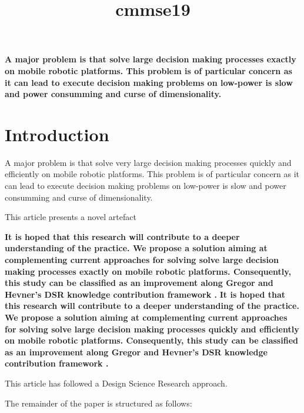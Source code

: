 \documentclass{article}
\title{cmmse19}
\author{}
\begin{document}
\maketitle
      

\textbf{
A major problem is that solve large decision making  processes exactly on mobile robotic platforms. This problem is of particular concern as it can lead to execute decision making problems on low-power is slow and power consumming and curse of dimensionality. 
}\section{Introduction}


    
A major problem is that solve very large decision making  processes quickly and efficiently on mobile robotic platforms. This problem is of particular concern as it can lead to execute decision making problems on low-power is slow and power consumming and curse of dimensionality. 
    

    

    
This article presents a novel artefact
    

    
\textbf{
It is hoped that this research will contribute to a deeper understanding of the practice. We propose a solution aiming at complementing current approaches for solving solve large decision making  processes exactly on mobile robotic platforms. Consequently, this study can be classified as an improvement along Gregor and Hevner’s DSR knowledge contribution framework \cite{Gregor2013}.
}\textbf{
It is hoped that this research will contribute to a deeper understanding of the practice. We propose a solution aiming at complementing current approaches for solving solve large decision making  processes quickly and efficiently on mobile robotic platforms. Consequently, this study can be classified as an improvement along Gregor and Hevner’s DSR knowledge contribution framework \cite{Gregor2013}.
}
      
This article has followed a Design Science Research approach.

The remainder of the paper is structured as follows: 

    
      


\end{document}
